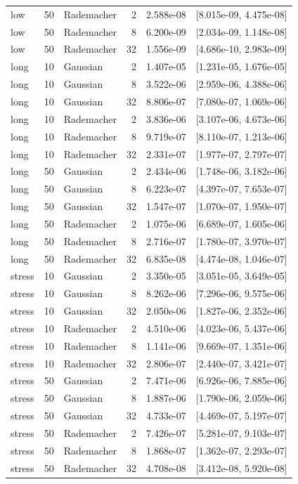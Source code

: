 \begin{longtable}{lrlrrl}
low & 50 & Rademacher & 2 & 2.588e-08 & [8.015e-09, 4.475e-08] \\
low & 50 & Rademacher & 8 & 6.200e-09 & [2.034e-09, 1.148e-08] \\
low & 50 & Rademacher & 32 & 1.556e-09 & [4.686e-10, 2.983e-09] \\
long & 10 & Gaussian & 2 & 1.407e-05 & [1.231e-05, 1.676e-05] \\
long & 10 & Gaussian & 8 & 3.522e-06 & [2.959e-06, 4.388e-06] \\
long & 10 & Gaussian & 32 & 8.806e-07 & [7.080e-07, 1.069e-06] \\
long & 10 & Rademacher & 2 & 3.836e-06 & [3.107e-06, 4.673e-06] \\
long & 10 & Rademacher & 8 & 9.719e-07 & [8.110e-07, 1.213e-06] \\
long & 10 & Rademacher & 32 & 2.331e-07 & [1.977e-07, 2.797e-07] \\
long & 50 & Gaussian & 2 & 2.434e-06 & [1.748e-06, 3.182e-06] \\
long & 50 & Gaussian & 8 & 6.223e-07 & [4.397e-07, 7.653e-07] \\
long & 50 & Gaussian & 32 & 1.547e-07 & [1.070e-07, 1.950e-07] \\
long & 50 & Rademacher & 2 & 1.075e-06 & [6.689e-07, 1.605e-06] \\
long & 50 & Rademacher & 8 & 2.716e-07 & [1.780e-07, 3.970e-07] \\
long & 50 & Rademacher & 32 & 6.835e-08 & [4.474e-08, 1.046e-07] \\
stress & 10 & Gaussian & 2 & 3.350e-05 & [3.051e-05, 3.649e-05] \\
stress & 10 & Gaussian & 8 & 8.262e-06 & [7.296e-06, 9.575e-06] \\
stress & 10 & Gaussian & 32 & 2.050e-06 & [1.827e-06, 2.352e-06] \\
stress & 10 & Rademacher & 2 & 4.510e-06 & [4.023e-06, 5.437e-06] \\
stress & 10 & Rademacher & 8 & 1.141e-06 & [9.669e-07, 1.351e-06] \\
stress & 10 & Rademacher & 32 & 2.806e-07 & [2.440e-07, 3.421e-07] \\
stress & 50 & Gaussian & 2 & 7.471e-06 & [6.926e-06, 7.885e-06] \\
stress & 50 & Gaussian & 8 & 1.887e-06 & [1.790e-06, 2.059e-06] \\
stress & 50 & Gaussian & 32 & 4.733e-07 & [4.469e-07, 5.197e-07] \\
stress & 50 & Rademacher & 2 & 7.426e-07 & [5.281e-07, 9.103e-07] \\
stress & 50 & Rademacher & 8 & 1.868e-07 & [1.362e-07, 2.293e-07] \\
stress & 50 & Rademacher & 32 & 4.708e-08 & [3.412e-08, 5.920e-08] \\
\bottomrule
\end{longtable}
